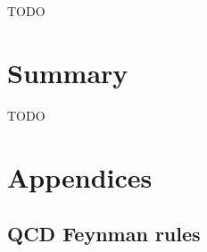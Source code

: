 \documentclass{article}
\theoremstyle{definition}
\numberwithin{equation}{section}
\begin{document}
TODO

\section{Summary}

TODO

\newpage




\newpage

\appendix
\section*{Appendices}
\renewcommand{\thesubsection}{\Alph{subsection}}

\subsection{QCD Feynman rules}
\label{sec:frules}
\end{document}
